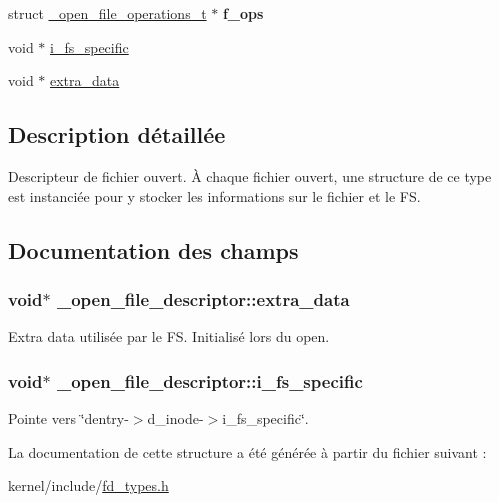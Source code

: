 \begin{DoxyCompactItemize}
\item 
\hypertarget{struct__open__file__descriptor_a6cd707cf9a5d837feba5ef2a2f91bfcd}{struct \hyperlink{struct__open__file__operations__t}{\+\_\+open\+\_\+file\+\_\+operations\+\_\+t} $\ast$ {\bfseries f\+\_\+ops}}\label{struct__open__file__descriptor_a6cd707cf9a5d837feba5ef2a2f91bfcd}

\item 
void $\ast$ \hyperlink{struct__open__file__descriptor_a2fc86f185e4b611a90f7727ef26ff3de}{i\+\_\+fs\+\_\+specific}
\item 
void $\ast$ \hyperlink{struct__open__file__descriptor_a99824795a31a8adea2162aed74162017}{extra\+\_\+data}
\end{DoxyCompactItemize}


\subsection{Description détaillée}
Descripteur de fichier ouvert. À chaque fichier ouvert, une structure de ce type est instanciée pour y stocker les informations sur le fichier et le F\+S. 

\subsection{Documentation des champs}
\hypertarget{struct__open__file__descriptor_a99824795a31a8adea2162aed74162017}{
\subsubsection[{extra\+\_\+data}]{\setlength{\rightskip}{0pt plus 5cm}void$\ast$ \+\_\+open\+\_\+file\+\_\+descriptor\+::extra\+\_\+data}}\label{struct__open__file__descriptor_a99824795a31a8adea2162aed74162017}
Extra data utilisée par le F\+S. Initialisé lors du open. \hypertarget{struct__open__file__descriptor_a2fc86f185e4b611a90f7727ef26ff3de}{
\subsubsection[{i\+\_\+fs\+\_\+specific}]{\setlength{\rightskip}{0pt plus 5cm}void$\ast$ \+\_\+open\+\_\+file\+\_\+descriptor\+::i\+\_\+fs\+\_\+specific}}\label{struct__open__file__descriptor_a2fc86f185e4b611a90f7727ef26ff3de}
Pointe vers \char`\"{}dentry-\/$>$d\+\_\+inode-\/$>$i\+\_\+fs\+\_\+specific\char`\"{}. 

La documentation de cette structure a été générée à partir du fichier suivant \+:\begin{DoxyCompactItemize}
\item 
kernel/include/\hyperlink{fd__types_8h}{fd\+\_\+types.\+h}\end{DoxyCompactItemize}
